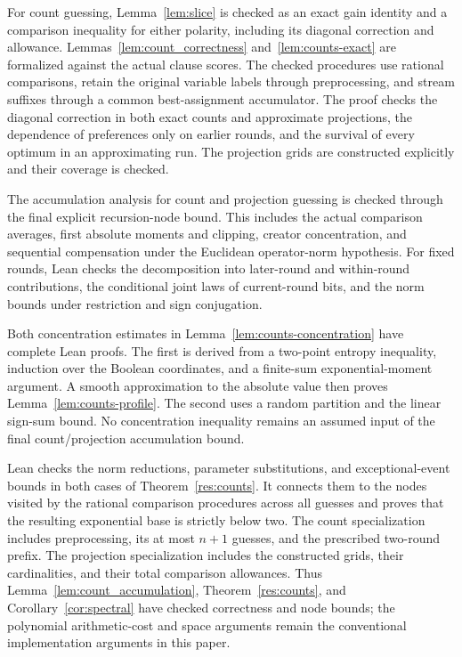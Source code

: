 \documentclass[11pt,a4paper]{article}
\theoremstyle{definition}
\theoremstyle{remark}
\begin{document}
For count guessing, Lemma~\ref{lem:slice} is checked as an exact gain
identity and a comparison inequality for either polarity, including its
diagonal correction and allowance. Lemmas~\ref{lem:count_correctness} and~\ref{lem:counts-exact}
are formalized against the actual clause scores. The checked procedures
use rational comparisons, retain the original variable labels through
preprocessing, and stream suffixes through a common best-assignment
accumulator. The proof checks the diagonal correction in both exact
counts and approximate projections, the dependence of preferences only
on earlier rounds, and the survival of every optimum in an approximating
run. The projection grids are constructed explicitly and their coverage
is checked.

The accumulation analysis for count and projection guessing is checked
through the final explicit recursion-node bound. This includes the actual
comparison averages, first absolute moments and clipping, creator concentration,
and sequential compensation under the Euclidean operator-norm hypothesis.
For fixed rounds, Lean checks the decomposition into later-round and
within-round contributions, the conditional joint laws of current-round bits,
and the norm bounds under restriction and sign conjugation.

Both concentration estimates in Lemma~\ref{lem:counts-concentration} have
complete Lean proofs. The first is derived from a two-point entropy inequality,
induction over the Boolean coordinates, and a finite-sum exponential-moment
argument. A smooth approximation to the absolute value then proves
Lemma~\ref{lem:counts-profile}. The second uses a random partition and the
linear sign-sum bound. No concentration inequality remains an assumed input
of the final count/projection accumulation bound.

Lean checks the norm reductions, parameter substitutions, and exceptional-event
bounds in both cases of Theorem~\ref{res:counts}. It connects them to the nodes
visited by the rational comparison procedures across all guesses and proves
that the resulting exponential base is strictly below two. The count
specialization includes preprocessing, its at most $n+1$ guesses, and the
prescribed two-round prefix. The projection specialization includes the
constructed grids, their cardinalities, and their total comparison allowances.
Thus Lemma~\ref{lem:count_accumulation}, Theorem~\ref{res:counts}, and
Corollary~\ref{cor:spectral} have checked correctness and node bounds;
the polynomial arithmetic-cost and space arguments remain the conventional
implementation arguments in this paper.
\end{document}
